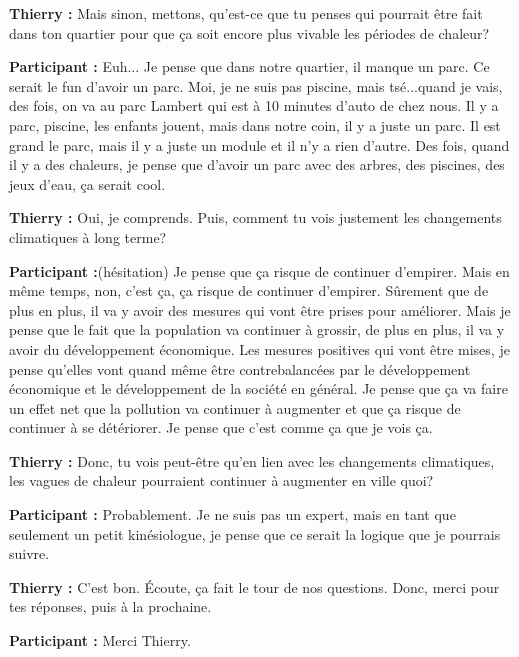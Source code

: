 \textbf{Thierry :} Mais sinon, mettons, qu'est-ce que tu penses qui pourrait être fait dans ton quartier pour que ça soit encore plus vivable les périodes de chaleur?

\textbf{Participant :} Euh... Je pense que dans notre quartier, il manque un parc. Ce serait le fun d'avoir un parc. Moi, je ne suis pas piscine, mais tsé...quand je vais, des fois, on va au parc Lambert qui est à 10 minutes d'auto de chez nous. Il y a parc, piscine, les enfants jouent, mais dans notre coin, il y a juste un parc. Il est grand le parc, mais il y a juste un module et il n'y a rien d'autre. Des fois, quand il y a des chaleurs, je pense que d'avoir un parc avec des arbres, des piscines, des jeux d'eau, ça serait cool.

\textbf{Thierry :} Oui, je comprends. Puis, comment tu vois justement les changements climatiques à long terme?

\textbf{Participant :}(hésitation) Je pense que ça risque de continuer d'empirer. Mais en même temps, non, c'est ça, ça risque de continuer d'empirer. Sûrement que de plus en plus, il va y avoir des mesures qui vont être prises pour améliorer. Mais je pense que le fait que la population va continuer à grossir, de plus en plus, il va y avoir du développement économique. Les mesures positives qui vont être mises, je pense qu'elles vont quand même être contrebalancées par le développement économique et le développement de la société en général. Je pense que ça va faire un effet net que la pollution va continuer à augmenter et que ça risque de continuer à se détériorer. Je pense que c'est comme ça que je vois ça.

\textbf{Thierry :} Donc, tu vois peut-être qu'en lien avec les changements climatiques, les vagues de chaleur pourraient continuer à augmenter en ville quoi?

\textbf{Participant :} Probablement. Je ne suis pas un expert, mais en tant que seulement un petit kinésiologue, je pense que ce serait la logique que je pourrais suivre.

\textbf{Thierry :} C'est bon. Écoute, ça fait le tour de nos questions. Donc, merci pour tes réponses, puis à la prochaine. 

\textbf{Participant :} Merci Thierry.
